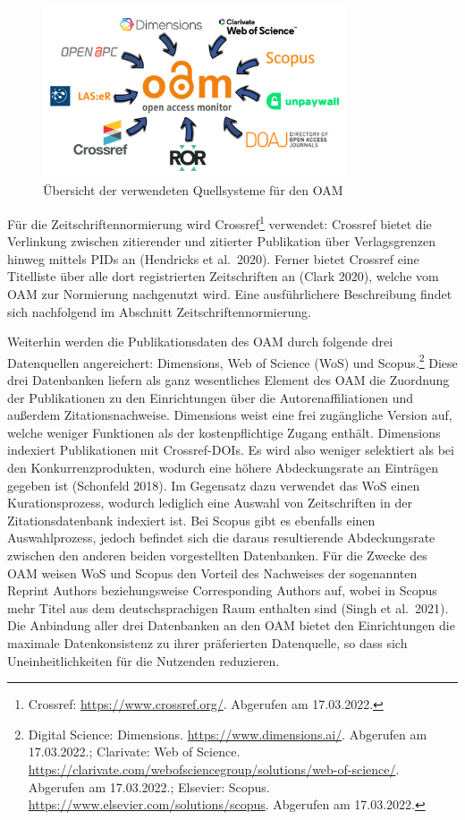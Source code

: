 \documentclass[a4paper,
fontsize=11pt,
oneside,
numbers=noperiodatend,
parskip=half-,
bibliography=totoc,
final
]{scrartcl}
\begin{document}
\begin{figure}
\centering
\includegraphics[width=0.8\textwidth]{img/Abb_2_Quelldatenbanken.png}
\caption{Übersicht der verwendeten Quellsysteme für den OAM}
\end{figure}

Für die Zeitschriftennormierung wird Crossref\footnote{Crossref:
  \url{https://www.crossref.org/}. Abgerufen am 17.03.2022.} verwendet:
Crossref bietet die Verlinkung zwischen zitierender und zitierter
Publikation über Verlagsgrenzen hinweg mittels PIDs an (Hendricks et
al.~2020). Ferner bietet Crossref eine Titelliste über alle dort
registrierten Zeitschriften an (Clark 2020), welche vom OAM zur
Normierung nachgenutzt wird. Eine ausführlichere Beschreibung findet
sich nachfolgend im Abschnitt Zeitschriftennormierung.

Weiterhin werden die Publikationsdaten des OAM durch folgende drei
Datenquellen angereichert: Dimensions, Web of Science (WoS) und
Scopus.\footnote{Digital Science: Dimensions.
  \url{https://www.dimensions.ai/}. Abgerufen am 17.03.2022.; Clarivate:
  Web of Science.
  \url{https://clarivate.com/webofsciencegroup/solutions/web-of-science/}.
  Abgerufen am 17.03.2022.; Elsevier: Scopus.
  \url{https://www.elsevier.com/solutions/scopus}. Abgerufen am
  17.03.2022.} Diese drei Datenbanken liefern als ganz wesentliches
Element des OAM die Zuordnung der Publikationen zu den Einrichtungen
über die Autorenaffiliationen und außerdem Zitationsnachweise.
Dimensions weist eine frei zugängliche Version auf, welche weniger
Funktionen als der kostenpflichtige Zugang enthält. Dimensions indexiert
Publikationen mit Crossref-DOIs. Es wird also weniger selektiert als bei
den Konkurrenzprodukten, wodurch eine höhere Abdeckungsrate an Einträgen
gegeben ist (Schonfeld 2018). Im Gegensatz dazu verwendet das WoS einen
Kurationsprozess, wodurch lediglich eine Auswahl von Zeitschriften in
der Zitationsdatenbank indexiert ist. Bei Scopus gibt es ebenfalls einen
Auswahlprozess, jedoch befindet sich die daraus resultierende
Abdeckungsrate zwischen den anderen beiden vorgestellten Datenbanken.
Für die Zwecke des OAM weisen WoS und Scopus den Vorteil des Nachweises
der sogenannten Reprint Authors beziehungsweise Corresponding Authors
auf, wobei in Scopus mehr Titel aus dem deutschsprachigen Raum enthalten
sind (Singh et al.~2021). Die Anbindung aller drei Datenbanken an den
OAM bietet den Einrichtungen die maximale Datenkonsistenz zu ihrer
präferierten Datenquelle, so dass sich Uneinheitlichkeiten für die
Nutzenden reduzieren.
\end{document}
